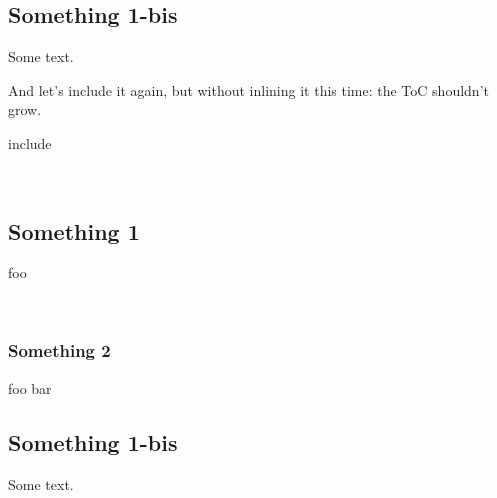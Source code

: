 \subsection{Something 1-bis\label{something-1-bis}}%
Some text.

And let's include it again, but without inlining it this time: the ToC shouldn't grow.

\begin{keyword}include\end{keyword}
 \hyperref[page-test+u+package+++ml-module-Include+u+sections-module-type-Something]{}\label{page-test+u+package+++ml-module-Include+u+sections-val-something}\\
\subsection{Something 1\label{something-1}}%
foo

\label{page-test+u+package+++ml-module-Include+u+sections-val-foo}\\
\subsubsection{Something 2\label{something-2}}%
\label{page-test+u+package+++ml-module-Include+u+sections-val-bar}\begin{ocamlindent}foo bar\end{ocamlindent}%
\medbreak
\subsection{Something 1-bis\label{something-1-bis}}%
Some text.



